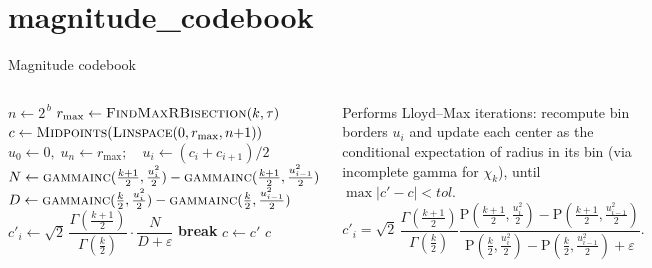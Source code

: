 \section{magnitude_codebook}


\begin{frame}[fragile]{Magnitude codebook}
  \begin{columns}[T,onlytextwidth]
    {
        \begin{algorithm}[H]
        \scriptsize
        \begin{algorithmic}[1]
            \State $n \gets 2^{\,b}$
            \State $r_{\max} \gets \textproc{FindMaxRBisection}(k,\tau)$
            \State $c \gets \textproc{Midpoints}(\textproc{Linspace}(0,r_{\max},n{+}1))$
                \State $u_0 \gets 0,\; u_n \gets r_{\max};\quad u_i \gets (c_i+c_{i+1})/2$
                \State $N \gets \textproc{gammainc}(\tfrac{k+1}{2}, \tfrac{u_i^2}{2})
                        - \textproc{gammainc}(\tfrac{k+1}{2}, \tfrac{u_{i-1}^2}{2})$
                \State $D \gets \textproc{gammainc}(\tfrac{k}{2}, \tfrac{u_i^2}{2})
                        - \textproc{gammainc}(\tfrac{k}{2}, \tfrac{u_{i-1}^2}{2})$
                \State $c'_i \gets \sqrt{2}\,\dfrac{\Gamma(\frac{k+1}{2})}{\Gamma(\frac{k}{2})}\cdot\dfrac{N}{D+\varepsilon}$
                 \State \textbf{break} \EndIf
                \State $c \gets c'$
            \EndFor
            \State \Return $c$
            \EndProcedure
        \end{algorithmic}
        \end{algorithm}
        \vspace{0.5em}
    }

    {\footnotesize
        Performs Lloyd–Max iterations: recompute bin borders $u_i$ and update each center
        as the conditional expectation of radius in its bin (via incomplete gamma for $\chi_k$),
        until $\max|c'-c|<\textit{tol}$.
        \begingroup
        \setlength{\abovedisplayskip}{2pt}\setlength{\belowdisplayskip}{2pt}
        \[
            c'_i=\sqrt{2}\,\frac{\Gamma(\frac{k+1}{2})}{\Gamma(\frac{k}{2})}
            \frac{\mathrm{P}(\frac{k+1}{2},\frac{u_i^2}{2})-\mathrm{P}(\frac{k+1}{2},\frac{u_{i-1}^2}{2})}
                {\mathrm{P}(\frac{k}{2},\frac{u_i^2}{2})-\mathrm{P}(\frac{k}{2},\frac{u_{i-1}^2}{2})+\varepsilon}.
        \]
        \endgroup
    }
  \end{columns}
\end{frame}

